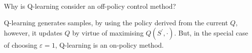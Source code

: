 
\begin{exercise}[Exercise 6.11]

Why is Q-learning consider an off-policy control method?

\end{exercise}


\begin{solution}

Q-learning generates samples, by using the policy derived from the current $Q$, however, it updates $Q$ by virtue of maximising $Q(S^\prime, \cdot)$.
But, in the special case of choosing $\varepsilon = 1$, Q-learning is an on-policy method.

\end{solution}

